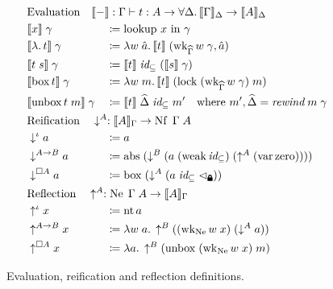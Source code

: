 \documentclass{article}
\theoremstyle{definition}\newtheorem{definition}{Definition}
\newcommand{\lock}{\text{\tikz[baseline]{
      \fill[rounded corners=.1ex] (-.75ex,0) rectangle (.75ex,1ex);
      \draw[line width=.3ex] (-.4ex,.5ex) -- ++(0,.75ex) arc (180:0:.4ex) -- ++(0,-.75ex);
}}}
\begin{document}
\begin{figure}
  \centering
  \begin{align*}
    &\mathrlap{\text{Evaluation} \quad \llbracket-\rrbracket : \Gamma \vdash t : A \to \forall\Delta. \, \llbracket\Gamma\rrbracket_\Delta \to \llbracket A \rrbracket_\Delta} &&\\
    &\llbracket x \rrbracket \; \gamma &&\coloneqq \text{lookup } x \text{ in } \gamma \\
    &\llbracket \lambda. \, t \rrbracket \; \gamma &&\coloneqq \lambda w \; \hat a.\, \llbracket t \rrbracket \; (\operatorname{wk}_{\widehat\Gamma} w \; \gamma, \hat a) \\
    &\llbracket t \; s \rrbracket \; \gamma &&\coloneqq \llbracket t \rrbracket \; \textit{id}_\subseteq \; (\llbracket s \rrbracket \; \gamma) \\
    &\llbracket \operatorname{box} t \rrbracket \; \gamma &&\coloneqq \lambda w \; m.\, \llbracket t \rrbracket \; (\operatorname{lock} \; (\operatorname{wk}_{\widehat\Gamma} w \; \gamma) \; m) \\
    &\llbracket \operatorname{unbox} t \; m \rrbracket \; \gamma &&\coloneqq \llbracket t \rrbracket \; \widehat\Delta \; \textit{id}_\subseteq \; m' \quad \text{where } m' , \widehat\Delta = \textit{rewind} \; m \; \gamma \\
    &\mathrlap{\text{Reification} \quad \downarrow^A : \llbracket A \rrbracket_\Gamma \to \operatorname{Nf} \; \Gamma \; A} &&\\
    &\downarrow^\iota a &&\coloneqq a \\
    &\downarrow^{A \to B} a &&\coloneqq \operatorname{abs} \; (\downarrow^B (a \; (\operatorname{weak} \textit{id}_\subseteq) \; (\uparrow^A (\operatorname{var} \operatorname{zero})))) \\
    &\downarrow^{\Box A} a &&\coloneqq \operatorname{box} \; (\downarrow^A (a \; \textit{id}_\subseteq \; \lhd_\lock)) \\
    &\mathrlap{\text{Reflection} \quad \uparrow^A : \operatorname{Ne} \; \Gamma \; A \to \llbracket A \rrbracket_\Gamma} &&\\
    &\uparrow^\iota x &&\coloneqq \operatorname{nt} a \\
    &\uparrow^{A \to B} x &&\coloneqq \lambda w \; a.\, \uparrow^B ((\operatorname{wk}_{\operatorname{Ne}} w \; x) \; (\downarrow^A a)) \\
    &\uparrow^{\Box A} x &&\coloneqq \lambda a.\, \uparrow^B (\operatorname{unbox} \; (\operatorname{wk}_{\operatorname{Ne}} w \; x) \; m)
  \end{align*}
  \caption{Evaluation, reification and reflection definitions. \label{fig:nbe}}
\end{figure}
\end{document}
